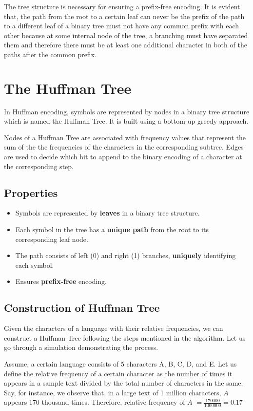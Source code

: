 \documentclass[18pt]{article}
\begin{document}
The tree structure is necessary for ensuring a prefix-free encoding. It is evident that, the path from the root to a certain leaf can never be the prefix of the path to a different leaf of a binary tree must not have any common prefix with each other because at some internal node of the tree, a branching must have separated them and therefore there must be at least one additional character in both of the paths after the common prefix.


\section{The Huffman Tree}

In Huffman encoding, symbols are represented by nodes in a binary
tree structure which is named the Huffman Tree. It is built using a bottom-up greedy approach.

Nodes of a Huffman Tree are associated with frequency values that represent the sum of the the frequencies of the characters in the corresponding subtree. Edges are used to decide which bit to append to the binary encoding of a character at the corresponding step.

\subsection{Properties}

\begin{itemize}
	\item Symbols are represented by \textbf{leaves} in a binary tree structure.
	\item Each symbol in the tree has a \textbf{unique path} from the root to its corresponding leaf node.
	\item The path consists of left (0) and right (1) branches, \textbf{uniquely} identifying each symbol.
	\item Ensures \textbf{prefix-free} encoding.
\end{itemize}

\subsection{Construction of Huffman Tree}

Given the characters of a language with their relative frequencies, we can construct a Huffman Tree following the steps mentioned in the algorithm. Let us go through a simulation demonstrating the process.

Assume, a certain language consists of 5 characters A, B, C, D, and E. Let us define the relative frequency of a certain character as the number of times it appears in a sample text divided by the total number of characters in the same. Say, for instance, we observe that, in a large text of 1 million characters, $A$ appears 170 thousand times. Therefore, relative frequency of $A$ $ = \frac{170000}{1000000} = 0.17$
\end{document}
